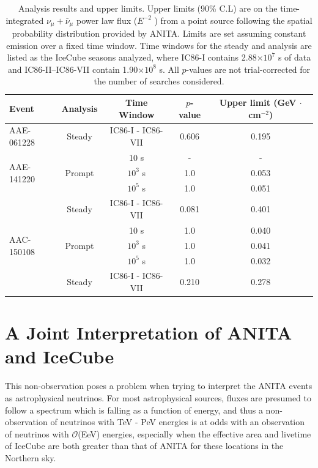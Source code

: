 \begin{table}%
    \caption[ANITA analysis results]{Analysis results and upper limits.  Upper limits (90\% C.L) are on the time-integrated $\nu_{\mu} + \bar{\nu}_{\mu}$ power law flux ($E^{-2}$ ) from a point source following the spatial probability distribution provided by ANITA. Limits are set assuming constant emission over a fixed time window. Time windows for the steady and analysis are listed as the IceCube seasons analyzed, where IC86-I contains 2.88$\times 10^7$ s of data and IC86-II--IC86-VII contain 1.90$\times 10^8$ s. All $p$-values are not trial-corrected for the number of searches considered.}
    \centering
    \begin{tabular}{l | c| c| c | c} \hline
     Event & Analysis & Time Window  & $p$-value & Upper limit (GeV $\cdot$ cm$^{-2}$)  \\ \hline \hline
     AAE-061228 & Steady & IC86-I - IC86-VII & 0.606 &  0.195 \\ \hline
     \multirow{3}{*}{AAE-141220} & & 10 s & - & - \\ 
	 & Prompt & $10^3$ s & 1.0 & 0.053 \\ 
	 & & $10^5$ s & 1.0 & 0.051 \\ \cline{2-5}
	 & Steady & IC86-I - IC86-VII & 0.081 & 0.401 \\ \hline
	 \multirow{3}{*}{AAC-150108} & & 10 s & 1.0 & 0.040 \\ 
	 & Prompt & $10^3$ s & 1.0 & 0.041 \\ 
	 & & $10^5$ s & 1.0 & 0.032 \\ \cline{2-5}
	 & Steady & IC86-I - IC86-VII & 0.210 & 0.278 \\  \hline
    \end{tabular}
    \label{tab:results}
    \vspace{0.2in}
\end{table}

\section{A Joint Interpretation of ANITA and IceCube}
\label{sec:ANITA:joint_interpretation}
This non-observation poses a problem when trying to interpret the ANITA events as astrophysical neutrinos. For most astrophysical sources, fluxes are presumed to follow a spectrum which is falling as a function of energy, and thus a non-observation of neutrinos with TeV - PeV energies is at odds with an observation of neutrinos with $\mathcal{O}$(EeV) energies, especially when the effective area and livetime of IceCube are both greater than that of ANITA for these locations in the Northern sky.


